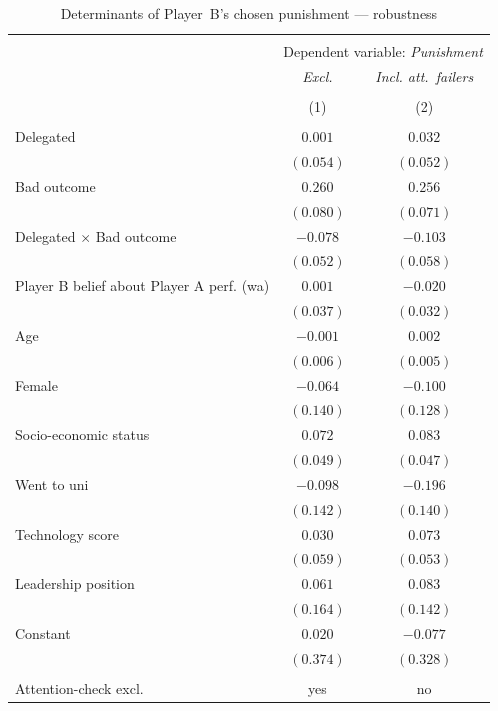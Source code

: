 \begin{table}[!htbp]
\centering
\scriptsize
\caption{Determinants of Player~B's chosen punishment --- robustness}
\label{tab:reg_punishment_robustness}
\begin{tabular}{lcc}
\\[-1.8ex]\hline
\hline \\[-1.8ex]
& \multicolumn{2}{c}{Dependent variable: \textit{Punishment}}\\[0.1cm]
& \textit{Excl.} & \textit{Incl. att.\ failers} \\
\\[-1.8ex] & (1) & (2) \\
\hline \\[-1.8ex]
 Delegated & $0.001$ & $0.032$ \\
  & $(0.054)$ & $(0.052)$ \\[0.1cm]
 Bad outcome & $0.260$ & $0.256$ \\
  & $(0.080)$ & $(0.071)$ \\[0.1cm]
 Delegated $\times$ Bad outcome & $-0.078$ & $-0.103$ \\
  & $(0.052)$ & $(0.058)$ \\[0.1cm]
 Player B belief about Player A perf. (wa) & $0.001$ & $-0.020$ \\
  & $(0.037)$ & $(0.032)$ \\[0.1cm]
 Age & $-0.001$ & $0.002$ \\
  & $(0.006)$ & $(0.005)$ \\[0.1cm]
 Female & $-0.064$ & $-0.100$ \\
  & $(0.140)$ & $(0.128)$ \\[0.1cm]
 Socio-economic status & $0.072$ & $0.083$ \\
  & $(0.049)$ & $(0.047)$ \\[0.1cm]
 Went to uni & $-0.098$ & $-0.196$ \\
  & $(0.142)$ & $(0.140)$ \\[0.1cm]
 Technology score & $0.030$ & $0.073$ \\
  & $(0.059)$ & $(0.053)$ \\[0.1cm]
 Leadership position & $0.061$ & $0.083$ \\
  & $(0.164)$ & $(0.142)$ \\[0.1cm]
 Constant & $0.020$ & $-0.077$ \\
  & $(0.374)$ & $(0.328)$ \\[0.1cm]
\hline \\[-1.8ex]
 Attention-check excl. & yes & no \\

\end{tabular}
\end{table}
